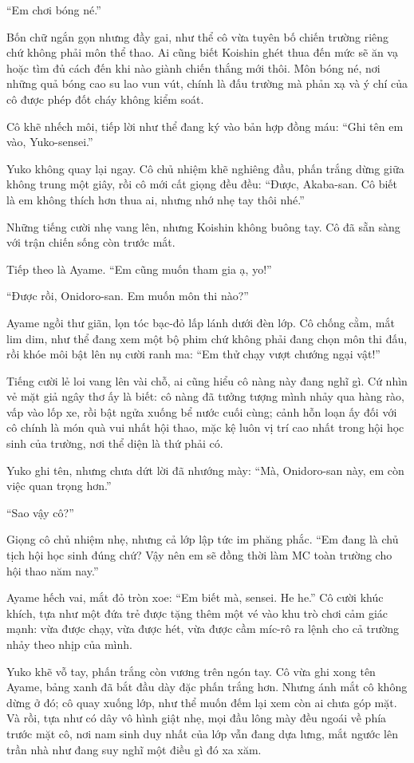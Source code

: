 \documentclass[../main.tex]{subfiles}
\begin{document}
``Em chơi bóng né.''

Bốn chữ ngắn gọn nhưng đầy gai, như thể cô vừa tuyên bố chiến trường riêng chứ không phải môn thể thao. Ai cũng biết Koishin ghét thua đến mức sẽ ăn vạ hoặc tìm đủ cách đến khi nào giành chiến thắng mới thôi. Môn bóng né, nơi những quả bóng cao su lao vun vút, chính là đấu trường mà phản xạ và ý chí của cô được phép đốt cháy không kiểm soát.

Cô khẽ nhếch môi, tiếp lời như thể đang ký vào bản hợp đồng máu: ``Ghi tên em vào, Yuko-sensei.''

Yuko không quay lại ngay. Cô chủ nhiệm khẽ nghiêng đầu, phấn trắng dừng giữa không trung một giây, rồi cô mới cất giọng đều đều: ``Được, Akaba-san. Cô biết là em không thích hơn thua ai, nhưng nhớ nhẹ tay thôi nhé.''

Những tiếng cười nhẹ vang lên, nhưng Koishin không buông tay. Cô đã sẵn sàng với trận chiến sống còn trước mắt.

Tiếp theo là Ayame. ``Em cũng muốn tham gia ạ, yo!''

``Được rồi, Onidoro-san. Em muốn môn thi nào?''

Ayame ngồi thư giãn, lọn tóc bạc-đỏ lấp lánh dưới đèn lớp. Cô chống cằm, mắt lim dim, như thể đang xem một bộ phim chứ không phải đang chọn môn thi đấu, rồi khóe môi bật lên nụ cười ranh ma: ``Em thử chạy vượt chướng ngại vật!''

Tiếng cười lẻ loi vang lên vài chỗ, ai cũng hiểu cô nàng này đang nghĩ gì. Cứ nhìn vẻ mặt giả ngây thơ ấy là biết: cô nàng đã tưởng tượng mình nhảy qua hàng rào, vấp vào lốp xe, rồi bật ngửa xuống bể nước cuối cùng; cảnh hỗn loạn ấy đối với cô chính là món quà vui nhất hội thao, mặc kệ luôn vị trí cao nhất trong hội học sinh của trường, nơi thể diện là thứ phải có.

Yuko ghi tên, nhưng chưa dứt lời đã nhướng mày: ``Mà, Onidoro-san này, em còn việc quan trọng hơn.''

``Sao vậy cô?''

Giọng cô chủ nhiệm nhẹ, nhưng cả lớp lập tức im phăng phắc. ``Em đang là chủ tịch hội học sinh đúng chứ? Vậy nên em sẽ đồng thời làm MC toàn trường cho hội thao năm nay.''

Ayame hếch vai, mắt đỏ tròn xoe: ``Em biết mà, sensei. He he.'' Cô cười khúc khích, tựa như một đứa trẻ được tặng thêm một vé vào khu trò chơi cảm giác mạnh: vừa được chạy, vừa được hét, vừa được cầm míc-rô ra lệnh cho cả trường nhảy theo nhịp của mình.

Yuko khẽ vỗ tay, phấn trắng còn vương trên ngón tay. Cô vừa ghi xong tên Ayame, bảng xanh đã bắt đầu dày đặc phấn trắng hơn. Nhưng ánh mắt cô không dừng ở đó; cô quay xuống lớp, như thể muốn đếm lại xem còn ai chưa góp mặt. Và rồi, tựa như có dây vô hình giật nhẹ, mọi đầu lông mày đều ngoái về phía trước mặt cô, nơi nam sinh duy nhất của lớp vẫn đang dựa lưng, mắt ngước lên trần nhà như đang suy nghĩ một điều gì đó xa xăm.
\end{document}
